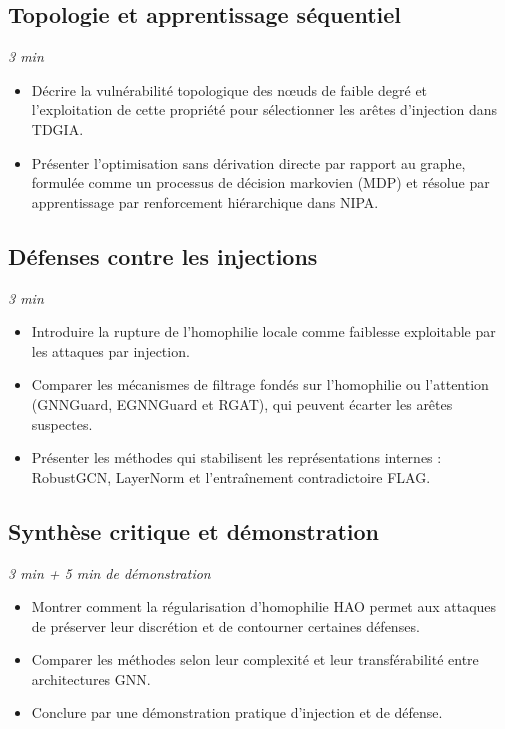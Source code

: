 \documentclass[11pt,a4paper]{article}
\newcommand{\duree}[1]{\hfill\textit{#1}}
\begin{document}
\subsection{Topologie et apprentissage séquentiel}\duree{3 min}
\begin{itemize}
    \item Décrire la vulnérabilité topologique des nœuds de faible degré et
    l'exploitation de cette propriété pour sélectionner les arêtes d'injection
    dans TDGIA.
    \item Présenter l'optimisation sans dérivation directe par rapport au graphe,
    formulée comme un processus de décision markovien (MDP) et résolue par
    apprentissage par renforcement hiérarchique dans NIPA.
\end{itemize}

\subsection{Défenses contre les injections}\duree{3 min}
\begin{itemize}
    \item Introduire la rupture de l'homophilie locale comme faiblesse exploitable
    par les attaques par injection.
    \item Comparer les mécanismes de filtrage fondés sur l'homophilie ou
    l'attention (GNNGuard, EGNNGuard et RGAT), qui peuvent écarter les arêtes
    suspectes.
    \item Présenter les méthodes qui stabilisent les représentations internes :
    RobustGCN, LayerNorm et l'entraînement contradictoire FLAG.
\end{itemize}

\subsection{Synthèse critique et démonstration}\duree{3 min + 5 min de démonstration}
\begin{itemize}
    \item Montrer comment la régularisation d'homophilie HAO permet aux attaques
    de préserver leur discrétion et de contourner certaines défenses.
    \item Comparer les méthodes selon leur complexité et leur transférabilité
    entre architectures GNN.
    \item Conclure par une démonstration pratique d'injection et de défense.
\end{itemize}
\end{document}
